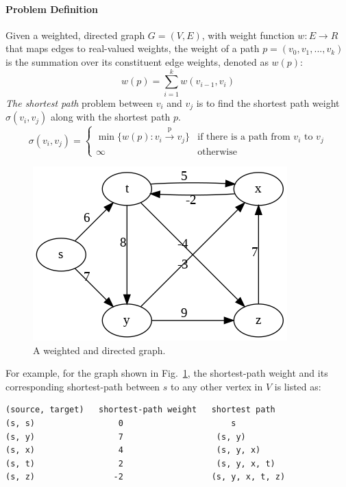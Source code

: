 \documentclass[../main.tex]{subfiles}
\begin{document}
\paragraph{Problem Definition} Given a weighted, directed graph $G=(V, E)$, with weight function $w:E\rightarrow R$ that maps edges to real-valued weights, the weight of a path $p = (v_0, v_1, ..., v_k)$ is the summation over its constituent edge weights, denoted as $w(p)$: 
\begin{equation}
    w(p)=\sum_{i=1}^{k} w(v_{i-1}, v_i)
\end{equation}
\textit{The shortest path} problem  between $v_i$ and $v_j$ is to find the shortest path weight $\sigma(v_i, v_j)$ along with the shortest path $p$. 
\begin{equation}
\sigma(v_i, v_j) = \left\{ 
\begin{array}{ll}
\min\{w(p):v_i\xrightarrow{\text{p}} v_j\} & \mbox{if there is a path from  } v_i \mbox{ to } v_j \\
\infty &\mbox{otherwise}
\end{array}
\right.
\end{equation} 
\begin{figure}[!ht]
    \centering
    \includegraphics[width=0.6\columnwidth]{fig/directed_graph_negative.png}
    \caption{A weighted and directed graph.}
    \label{fig:sp_udg}
\end{figure}
For example, for the graph shown in Fig.~\ref{fig:sp_udg}, the shortest-path weight and its corresponding shortest-path between $s$ to any other vertex in $V$ is listed as:
\begin{lstlisting}[numbers=none]
(source, target)   shortest-path weight   shortest path
(s, s)                 0                      s
(s, y)                 7                   (s, y)
(s, x)                 4                   (s, y, x)
(s, t)                 2                   (s, y, x, t)
(s, z)                -2                  (s, y, x, t, z)
\end{lstlisting}
\end{document}
